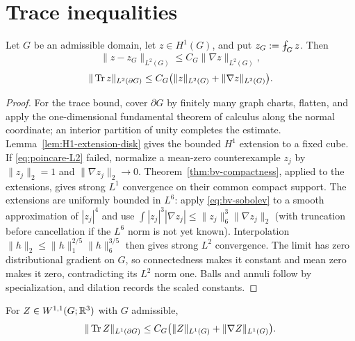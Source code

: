 \section{Trace inequalities}\label{sec:trace-ineq}

\begin{proposition}\label{prop:poincare-trace}
Let $G$ be an admissible domain, let $z\in H^1(G)$, and put
$z_G:=\avg_Gz$.  Then
\begin{equation}\label{eq:poincare-L2}
  \|z-z_G\|_{L^2(G)}\le C_G\|\nabla z\|_{L^2(G)},
\end{equation}
\begin{equation}\label{eq:trace-L2}
  \|\operatorname{Tr} z\|_{L^2(\partial G)}
  \le C_G\bigl(\|z\|_{L^2(G)}+\|\nabla z\|_{L^2(G)}\bigr).
\end{equation}
\end{proposition}

\begin{proof}
For the trace bound, cover $\partial G$ by finitely many graph charts,
flatten, and apply the one-dimensional fundamental theorem of calculus along
the normal coordinate; an interior partition of unity completes the estimate.
Lemma~\ref{lem:H1-extension-disk} gives the bounded $H^1$ extension to a
fixed cube.  If \eqref{eq:poincare-L2} failed, normalize a mean-zero
counterexample $z_j$ by $\|z_j\|_2=1$ and $\|\nabla z_j\|_2\to0$.
Theorem~\ref{thm:bv-compactness}, applied to the extensions, gives strong
$L^1$ convergence on their common compact support.  The extensions are
uniformly bounded in $L^6$: apply \eqref{eq:bv-sobolev} to a smooth
approximation of $|z_j|^4$ and use
$\int|z_j|^3|\nabla z_j|\le\|z_j\|_6^3\|\nabla z_j\|_2$ (with truncation
before cancellation if the $L^6$ norm is not yet known).  Interpolation
$\|h\|_2\le\|h\|_1^{2/5}\|h\|_6^{3/5}$ then gives strong $L^2$ convergence.
The limit has zero distributional gradient on $G$, so connectedness makes it
constant and mean zero makes it zero, contradicting its $L^2$ norm one.
Balls and annuli follow by specialization, and dilation records the scaled
constants.
\end{proof}

\begin{proposition}[$L^1$ trace]\label{prop:trace-L1}
For $Z\in W^{1,1}(G;\mathbb R^3)$ with $G$ admissible,
\begin{equation}\label{eq:trace-L1}
  \|\operatorname{Tr} Z\|_{L^1(\partial G)}
  \le C_G\bigl(\|Z\|_{L^1(G)}+\|\nabla Z\|_{L^1(G)}\bigr).
\end{equation}
\end{proposition}

